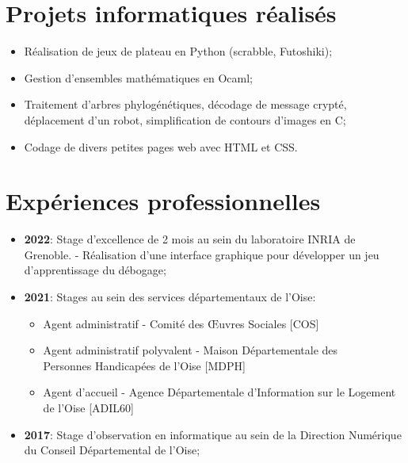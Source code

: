 \documentclass[10pt, oneside, a4paper, titlepage]{article}
\begin{document}
\begin{tcolorbox}
\begin{minipage}[t]{12cm}
\begin{tcolorbox}[grow to right by = 0.6cm, colback = gray!25, colframe = white]
                \section*{Projets informatiques réalisés}
                \begin{itemize}
                    \item Réalisation de jeux de plateau en Python (scrabble, Futoshiki);
                    \item Gestion d’ensembles mathématiques en Ocaml;
                    \item Traitement d’arbres phylogénétiques, décodage de message crypté, déplacement d’un robot, simplification de contours d’images en C;
                    \item Codage de divers petites pages web avec HTML et CSS.

                \end{itemize}
                
                \section*{Expériences professionnelles}
                \begin{itemize}
                    \item \textbf{2022}: Stage d'excellence de 2 mois au sein du laboratoire INRIA 
                    de Grenoble. - Réalisation d'une 
                    interface graphique pour développer un jeu d'apprentissage
                    du débogage;
                    \item \textbf{2021}: Stages au sein des services départementaux de l’Oise:
                    \begin{itemize}
                        \item Agent administratif - Comité des Œuvres Sociales [COS]
                        \item Agent administratif polyvalent - Maison Départementale des \\Personnes Handicapées de l’Oise [MDPH]
                        \item Agent d’accueil - Agence Départementale d’Information sur le Logement de l’Oise [ADIL60]

                    \end{itemize}
                    \item \textbf{2017}: Stage d’observation en informatique au sein de la Direction Numérique du Conseil Départemental de l'Oise;
                    

\end{itemize}
\end{tcolorbox}
\end{minipage}
\end{tcolorbox}
\end{document}
